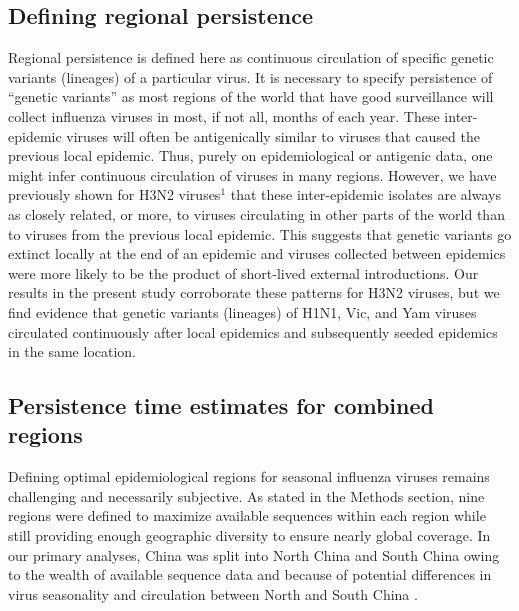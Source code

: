 \documentclass[11pt,oneside,letterpaper]{article}
\begin{document}
\subsection*{Defining regional persistence}

Regional persistence is defined here as continuous circulation of specific genetic variants (lineages) of a particular virus.
It is necessary to specify persistence of ``genetic variants'' as most regions of the world that have good surveillance will collect influenza viruses in most, if not all, months of each year.
These inter-epidemic viruses will often be antigenically similar to viruses that caused the previous local epidemic.
Thus, purely on epidemiological or antigenic data, one might infer continuous circulation of viruses in many regions.
However, we have previously shown for H3N2 viruses$^1$ that these inter-epidemic isolates are always as closely related, or more, to viruses circulating in other parts of the world than to viruses from the previous local epidemic.
This suggests that genetic variants go extinct locally at the end of an epidemic and viruses collected between epidemics were more likely to be the product of short-lived external introductions.
Our results in the present study corroborate these patterns for H3N2 viruses, but we find evidence that genetic variants (lineages) of H1N1, Vic, and Yam viruses circulated continuously after local epidemics and subsequently seeded epidemics in the same location.

\subsection*{Persistence time estimates for combined regions}

Defining optimal epidemiological regions for seasonal influenza viruses remains challenging and necessarily subjective.
As stated in the Methods section, nine regions were defined to maximize available sequences within each region while still providing enough geographic diversity to ensure nearly global coverage.
In our primary analyses, China was split into North China and South China owing to the wealth of available sequence data and because of potential differences in virus seasonality and circulation between North and South China \cite{Yu13}.
\end{document}
